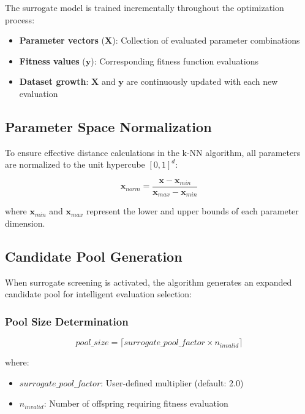 \documentclass[12pt,a4paper]{article}
\begin{document}
The surrogate model is trained incrementally throughout the optimization process:
\begin{itemize}
\item \textbf{Parameter vectors} ($\mathbf{X}$): Collection of evaluated parameter combinations
\item \textbf{Fitness values} ($\mathbf{y}$): Corresponding fitness function evaluations
\item \textbf{Dataset growth}: $\mathbf{X}$ and $\mathbf{y}$ are continuously updated with each new evaluation
\end{itemize}

\subsection{Parameter Space Normalization}

To ensure effective distance calculations in the k-NN algorithm, all parameters are normalized to the unit hypercube $[0,1]^d$:

\begin{equation}
\mathbf{x}_{norm} = \frac{\mathbf{x} - \mathbf{x}_{min}}{\mathbf{x}_{max} - \mathbf{x}_{min}}
\end{equation}

where $\mathbf{x}_{min}$ and $\mathbf{x}_{max}$ represent the lower and upper bounds of each parameter dimension.

\subsection{Candidate Pool Generation}

When surrogate screening is activated, the algorithm generates an expanded candidate pool for intelligent evaluation selection:

\subsubsection{Pool Size Determination}
\begin{equation}
pool\_size = \lceil surrogate\_pool\_factor \times n_{invalid} \rceil
\end{equation}

where:
\begin{itemize}
\item $surrogate\_pool\_factor$: User-defined multiplier (default: 2.0)
\item $n_{invalid}$: Number of offspring requiring fitness evaluation
\end{itemize}
\end{document}
